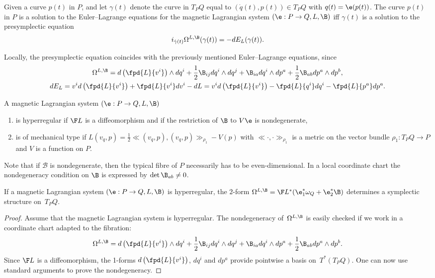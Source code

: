 \begin{proposition}\label{def:el} Given a curve $p(t)$ in $P$, and let $\gamma(t)$ denote the curve in $T_PQ$ equal to $(\dot q(t), p(t))\in T_PQ$ with $q(t)=\e(p(t))$. The curve $p(t)$ in $P$ is a solution to the Euler--Lagrange equations for the magnetic Lagrangian system $(\e:P\to Q,L,\B)$ iff  $\gamma(t)$ is a solution to the presymplectic equation
\[i_{\dot \gamma(t)} \Omega^{L,\B} (\gamma(t)) = -dE_L(\gamma(t)).\]
\end{proposition}
Locally, the presymplectic equation coincides with the previously mentioned Euler--Lagrange equations, since
\begin{gather*}
\Omega^{L,\B}  = d\left(\fpd{L}{v^i} \right)\wedge d q^i + \frac12 \B_{ij} dq^i \wedge dq^j + \B_{ia}dq^i\wedge dp^a + \frac12 \B_{ab} dp^a\wedge dp^b,\\
 dE_L   =v^i d\left(\fpd{L}{v^i} \right) + \fpd{L}{v^i} dv^i - dL=v^i d\left(\fpd{L}{v^i} \right) - \fpd{L}{q^i} dq^i - \fpd{L}{p^a} dp^a.
\end{gather*}

\begin{definition}A magnetic Lagrangian system $(\e:P\to Q,L,\B)$
\begin{enumerate}\itemsep=0pt \item[1)] is hyperregular if $\F L$ is  a dif\/feomorphism and if the restriction of $\B$ to $V\e$ is nondegenerate,
 \item[2)] is of mechanical type if $L(v_q,p)= \frac12 \ll (v_q,p) ,(v_q,p)\gg_{\rho_1}- V(p)$ with $\ll \cdot , \cdot \gg_{\rho_1}$ is a metric on the vector bundle $\rho_1:T_PQ \to P$ and $V$ is a function on $P$. \end{enumerate}
\end{definition}

Note that if $\mathcal{B}$ is nondegenerate, then the typical f\/ibre of $P$ necessarily has to be even-dimensional.
In a local coordinate chart the nondegeneracy condition on $\B$ is expressed by $\det \B_{ab}\neq0$.
\begin{proposition} If a magnetic Lagrangian system $(\e:P\to Q,L,\B)$ is hyperregular, the $2$-form $\Omega^{L,\B} = \F L^*(\e^*_1\omega_{Q} +\e^*_2\B)$ determines a symplectic structure on~$T_PQ$.
\end{proposition}
\begin{proof}
Assume that the magnetic Lagrangian system is hyperregular. The nondegeneracy of~$\Omega^{L,\B}$ is easily checked if we work in a coordinate chart adapted to the f\/ibration:
\[
\Omega^{L,\B} = d\left(\fpd{L}{v^i} \right)\wedge d q^i + \frac12 \B_{ij} dq^i \wedge dq^j + \B_{ia}dq^i\wedge dp^a + \frac12 \B_{ab} dp^a\wedge dp^b.
\]
Since $\F L$ is a dif\/feomorphism, the 1-forms $d\left(\fpd{L}{v^i} \right)$, $dq^i$ and $dp^a$ provide pointwise a basis on~$T^*(T_PQ)$. One can now use standard arguments to prove the nondegeneracy.
\end{proof}

